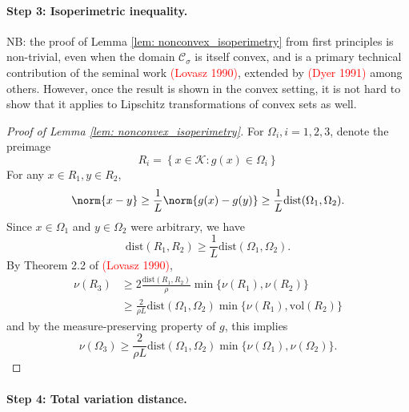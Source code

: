 \documentclass{report}
\newcommand{\set}[1]{\left\{#1\right\}}
\newcommand{\vol}{\mathrm{vol}}
\newcommand{\1}{\mathbf{1}}
\newcommand{\mc}[1]{\mathcal{#1}}
\newcommand{\dist}{\mathrm{dist}}
\theoremstyle{alden}
\theoremstyle{aldenthm}
\theoremstyle{definition}
\theoremstyle{remark}
\begin{document}
\paragraph{Step 3: Isoperimetric inequality.}
NB: the proof of Lemma \ref{lem: nonconvex_isoperimetry} from first principles is non-trivial, even when the domain $\mc{C}_{\sigma}$ is itself convex, and is a primary technical contribution of the seminal work \textcolor{red}{(Lovasz 1990)}, extended by \textcolor{red}{(Dyer 1991)} among others. However, once the result is shown in the convex setting, it is not hard to show that it applies to Lipschitz transformations of convex sets as well.
\begin{proof}[Proof of Lemma \ref{lem: nonconvex_isoperimetry}]
	For $\Omega_i, i = 1,2,3$, denote the preimage
	\begin{equation*}
	R_i = \set{x \in \mathcal{K}: g(x) \in \Omega_i}
	\end{equation*}
	For any $x \in R_1, y \in R_2$, 
	\begin{equation*}
	\norm{x - y} \geq \frac{1}{L}\norm{g(x) - g(y)} \geq \frac{1}{L} \dist(\Omega_1, \Omega_2). 
	\end{equation*}
	Since $x \in \Omega_1$ and $y \in \Omega_2$ were arbitrary, we have
	\begin{equation*}
	\dist(R_1, R_2) \geq \frac{1}{L} \dist(\Omega_1, \Omega_2).
	\end{equation*}
	By Theorem 2.2 of \textcolor{red}{(Lovasz 1990)},
	\begin{align*}
	\nu(R_3) & \geq 2\frac{\dist(R_1, R_2)}{\rho} \min \{\nu(R_1), \nu(R_2)\} \\
	& \geq \frac{2}{\rho L} \dist(\Omega_1, \Omega_2) \min\{\nu(R_1), \vol(R_2)\}
	\end{align*}
	and by the measure-preserving property of $g$, this implies
	\begin{equation*}
	\nu(\Omega_3) \geq\frac{2}{\rho L} \dist(\Omega_1, \Omega_2) \min\{\nu(\Omega_1), \nu(\Omega_2)\}.
	\end{equation*}
\end{proof}

\paragraph{Step 4: Total variation distance.}
\end{document}
